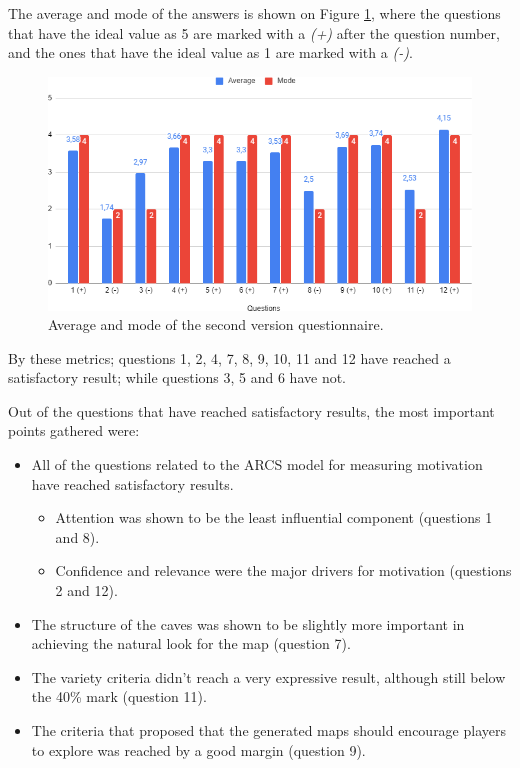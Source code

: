 The average and mode of the answers is shown on Figure \ref{fig:final_res}, where the questions that have the ideal value as 5 are marked with a \emph{(+)} after the question number, and the ones that have the ideal value as 1 are marked with a \emph{(-)}.

\begin{figure}[h]
    \caption{Average and mode of the second version questionnaire.}
    \centerline{\includegraphics{images/survey/final_results.png}}
    \label{fig:final_res}
\end{figure}

By these metrics; questions 1, 2, 4, 7, 8, 9, 10, 11 and 12 have reached a satisfactory result; while questions 3, 5 and 6 have not.

Out of the questions that have reached satisfactory results, the most important points gathered were:
\begin{itemize}
    \item All of the questions related to the ARCS model for measuring motivation have reached satisfactory results.
    \begin{itemize}
        \item Attention was shown to be the least influential component (questions 1 and 8).
        \item Confidence and relevance were the major drivers for motivation (questions 2 and 12).
    \end{itemize}
    \item The structure of the caves was shown to be slightly more important in achieving the natural look for the map (question 7).
    \item The variety criteria didn't reach a very expressive result, although still below the 40\% mark (question 11).
    \item The criteria that proposed that the generated maps should encourage players to explore was reached by a good margin (question 9).
\end{itemize}

